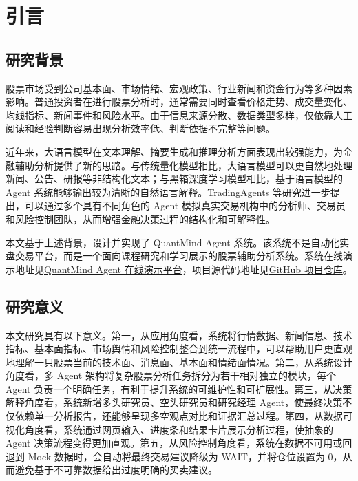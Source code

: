 \documentclass[UTF8,a4paper,12pt]{ctexart}
\begin{document}
\newpage

\section{引言}

\subsection{研究背景}

股票市场受到公司基本面、市场情绪、宏观政策、行业新闻和资金行为等多种因素影响。普通投资者在进行股票分析时，通常需要同时查看价格走势、成交量变化、均线指标、新闻事件和风险水平。由于信息来源分散、数据类型多样，仅依靠人工阅读和经验判断容易出现分析效率低、判断依据不完整等问题。

近年来，大语言模型在文本理解、摘要生成和推理分析方面表现出较强能力，为金融辅助分析提供了新的思路。与传统量化模型相比，大语言模型可以更自然地处理新闻、公告、研报等非结构化文本；与黑箱深度学习模型相比，基于语言模型的 Agent 系统能够输出较为清晰的自然语言解释。TradingAgents 等研究进一步提出，可以通过多个具有不同角色的 Agent 模拟真实交易机构中的分析师、交易员和风险控制团队，从而增强金融决策过程的结构化和可解释性。

本文基于上述背景，设计并实现了 QuantMind Agent 系统。该系统不是自动化实盘交易平台，而是一个面向课程研究和学习展示的股票辅助分析系统。系统在线演示地址见\href{https://quantmind-agent.zeabur.app/}{QuantMind Agent 在线演示平台}，项目源代码地址见\href{https://github.com/sunpu24/QuantMind-Agent}{GitHub 项目仓库}。

\subsection{研究意义}

本文研究具有以下意义。第一，从应用角度看，系统将行情数据、新闻信息、技术指标、基本面指标、市场舆情和风险控制整合到统一流程中，可以帮助用户更直观地理解一只股票当前的技术面、消息面、基本面和情绪面情况。第二，从系统设计角度看，多 Agent 架构将复杂股票分析任务拆分为若干相对独立的模块，每个 Agent 负责一个明确任务，有利于提升系统的可维护性和可扩展性。第三，从决策解释角度看，系统新增多头研究员、空头研究员和研究经理 Agent，使最终决策不仅依赖单一分析报告，还能够呈现多空观点对比和证据汇总过程。第四，从数据可视化角度看，系统通过网页输入、进度条和结果卡片展示分析过程，使抽象的 Agent 决策流程变得更加直观。第五，从风险控制角度看，系统在数据不可用或回退到 Mock 数据时，会自动将最终交易建议降级为 WAIT，并将仓位设置为 0，从而避免基于不可靠数据给出过度明确的买卖建议。
\end{document}
